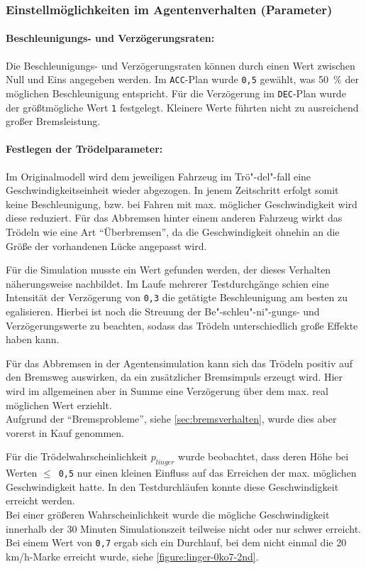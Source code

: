 \subsubsection{Einstellmöglichkeiten im Agentenverhalten (Parameter)}

\paragraph*{Beschleunigungs- und Verzögerungsraten:}
\label{sec:acc-dec-rate}
Die Beschleunigungs- und Verzögerungsraten können durch einen Wert zwischen Null und Eins angegeben werden.
Im \texttt{ACC}-Plan wurde \texttt{0,5} gewählt, was \mbox{50 $\%$} der möglichen Beschleunigung entspricht.
Für die Verzögerung im \texttt{DEC}-Plan wurde der größtmögliche Wert \texttt{1} festgelegt. 
Kleinere Werte führten nicht zu ausreichend großer Bremsleistung.


\paragraph*{Festlegen der Trödelparameter:}
\label{sec:lingersweetspot}
Im Originalmodell wird dem jeweiligen Fahrzeug im Trö"-del"-fall eine Geschwindigkeitseinheit wieder abgezogen. 
In jenem Zeitschritt erfolgt somit keine Beschleunigung, bzw. bei Fahren mit max. möglicher Geschwindigkeit wird diese reduziert. 
Für das Abbremsen hinter einem anderen Fahrzeug wirkt das Trödeln wie eine Art \enquote{Überbremsen}, da die Geschwindigkeit ohnehin an die Größe der vorhandenen Lücke angepasst wird.

Für die Simulation musste ein Wert gefunden werden, der dieses Verhalten näherungsweise nachbildet.
Im Laufe mehrerer Testdurchgänge schien eine Intensität der Verzögerung von \texttt{0,3} die getätigte Beschleunigung am besten zu egalisieren. 
Hierbei ist noch die Streuung der Be"-schleu"-ni"-gungs- und Verzögerungswerte zu beachten, sodass das Trödeln unterschiedlich große Effekte haben kann.

Für das Abbremsen in der Agentensimulation kann sich das Trödeln positiv auf den Bremsweg auswirken, da ein zusätzlicher Bremsimpuls erzeugt wird. 
Hier wird im allgemeinen aber in Summe eine Verzögerung über dem max. real möglichen Wert erziehlt.
\\
Aufgrund der \enquote{Bremsprobleme}, siehe \cref{sec:bremsverhalten}, wurde dies aber vorerst in Kauf genommen.

Für die Trödelwahrscheinlichkeit $ p_{linger} $ wurde beobachtet, dass deren Höhe bei Werten \mbox{$\leq$ \texttt{0,5}} nur einen kleinen Einfluss auf das Erreichen der max. möglichen Geschwindigkeit hatte.
In den Testdurchläufen konnte diese Geschwindigkeit erreicht werden.
\\
Bei einer größeren Wahrscheinlichkeit wurde die mögliche Geschwindigkeit innerhalb der 30 Minuten Simulationszeit teilweise nicht oder nur schwer erreicht.
Bei einem Wert von \texttt{0,7} ergab sich ein Durchlauf, bei dem nicht einmal die 20 km/h-Marke erreicht wurde, siehe \cref{figure:linger-0ko7-2nd}.

